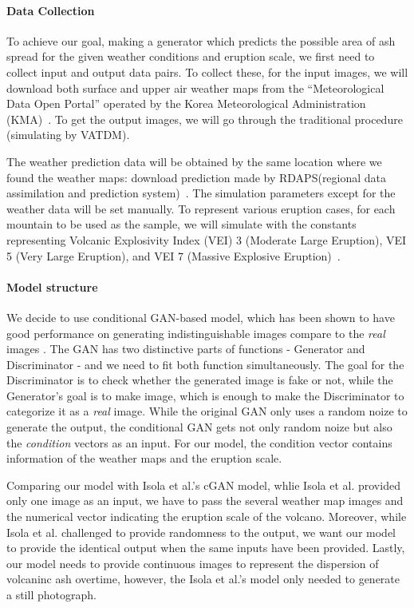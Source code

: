 \documentclass{article}
\begin{document}
\begin{doublespacing}
{  \paragraph{Data Collection}
  To achieve our goal, making a generator which predicts the possible area of ash spread for the 
  given weather conditions and eruption scale, we first need to collect input and output data pairs.
  To collect these, for the input images, we will download both surface and upper air weather maps 
  from the “Meteorological Data Open Portal” operated by the Korea Meteorological Administration 
  (KMA)~\cite{MDOP}. To get the output images, we will go through the traditional procedure 
  (simulating by VATDM).
  
  The weather prediction data will be obtained by the same location where we found the weather maps:
  download prediction made by RDAPS(regional data assimilation and prediction system)~\cite{MDOP}.
  The simulation parameters except for the weather data will be set manually. To represent various 
  eruption cases, for each mountain to be used as the sample, we will simulate with the constants 
  representing Volcanic Explosivity Index (VEI) 3 (Moderate Large Eruption), VEI 5 (Very Large 
  Eruption), and VEI 7 (Massive Explosive Eruption)~\cite[p.1232]{Newhall1982}. 

  \paragraph{Model structure}
  We decide to use conditional GAN-based model, which has been shown to have good performance on 
  generating indistinguishable images compare to the \emph{real} images 
  \cite{isola2016imagetoimage}. The GAN has two distinctive parts of functions - Generator and 
  Discriminator - and we need to fit both function simultaneously. The goal for the Discriminator is
  to check whether the generated image is fake or not, while the Generator's goal is to make image, 
  which is enough to make the Discriminator to categorize it as a \emph{real} image. While the 
  original GAN only uses a random noize to generate the output, the conditional GAN gets not only 
  random noize but also the \emph{condition} vectors as an input. For our model, the condition 
  vector contains information of the weather maps and the eruption scale.

  Comparing our model with Isola et al.\cite{isola2016imagetoimage}'s cGAN model, whlie Isola et 
  al. provided only one image as an input, we have to pass the several weather map images and the 
  numerical vector indicating the eruption scale of the volcano. Moreover, while Isola et 
  al.\cite{isola2016imagetoimage} challenged to provide randomness to the output, we want our model 
  to provide the identical output when the same inputs have been provided. Lastly, our model needs 
  to provide continuous images to represent the dispersion of volcaninc ash overtime, however, the 
  Isola et al.\cite{isola2016imagetoimage}'s model only needed to generate a still photograph.

}
\end{doublespacing}
\end{document}
